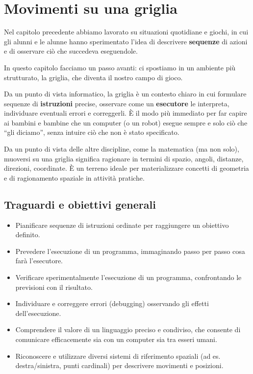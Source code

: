 \chapter{Movimenti su una griglia}\label{capitolo-4-movimenti-su-una-griglia}

Nel capitolo precedente abbiamo lavorato su situazioni quotidiane e giochi, in cui gli alunni e le alunne hanno sperimentato l'idea di descrivere \textbf{sequenze} di azioni e di osservare ciò che succedeva eseguendole.

In questo capitolo facciamo un passo avanti: ci spostiamo in un ambiente più strutturato, la griglia, che diventa il nostro campo di gioco.

Da un punto di vista informatico, la griglia è un contesto chiaro in cui formulare sequenze di \textbf{istruzioni} precise, osservare come un \textbf{esecutore} le interpreta, individuare eventuali errori e correggerli. È il modo più immediato per far capire ai bambini e bambine che un computer (o un robot) esegue sempre e solo ciò che ``gli diciamo'', senza intuire ciò che non è stato specificato.

Da un punto di vista delle altre discipline, come la matematica (ma non solo), muoversi su una griglia significa ragionare in termini di spazio, angoli, distanze, direzioni, coordinate. È un terreno ideale per materializzare concetti di geometria e di ragionamento spaziale in attività pratiche.

\section{Traguardi e obiettivi generali }\label{traguardi-e-obiettivi-generali-1}

\begin{itemize}
\item
  Pianificare sequenze di istruzioni ordinate per raggiungere un obiettivo definito.
\item
  Prevedere l'esecuzione di un programma, immaginando passo per passo cosa farà l'esecutore.
\item
  Verificare sperimentalmente l'esecuzione di un programma, confrontando le previsioni con il risultato.
\item
  Individuare e correggere errori (debugging) osservando gli effetti dell'esecuzione.
\item
  Comprendere il valore di un linguaggio preciso e condiviso, che consente di comunicare efficacemente sia con un computer sia tra esseri umani.
\item
  Riconoscere e utilizzare diversi sistemi di riferimento spaziali (ad es. destra/sinistra, punti cardinali) per descrivere movimenti e posizioni.
\end{itemize}

